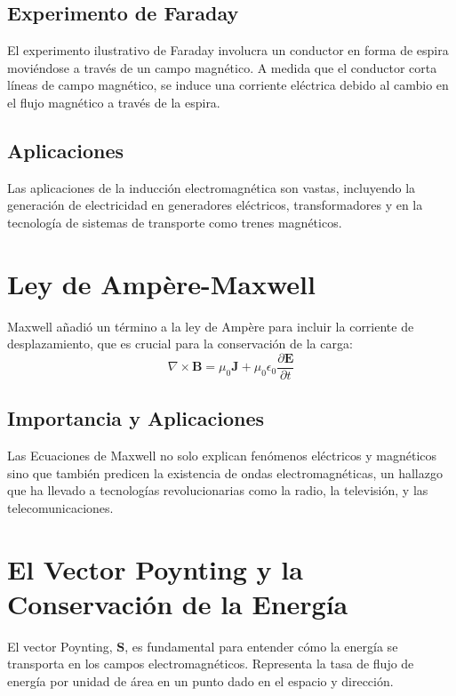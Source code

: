 \documentclass{article}
\begin{document}
\subsection{Experimento de Faraday}
El experimento ilustrativo de Faraday involucra un conductor en forma de espira moviéndose a través de un campo magnético. A medida que el conductor corta líneas de campo magnético, se induce una corriente eléctrica debido al cambio en el flujo magnético a través de la espira. 


\subsection{Aplicaciones}
Las aplicaciones de la inducción electromagnética son vastas, incluyendo la generación de electricidad en generadores eléctricos, transformadores y en la tecnología de sistemas de transporte como trenes magnéticos.


\section{Ley de Ampère-Maxwell}
Maxwell añadió un término a la ley de Ampère para incluir la corriente de desplazamiento, que es crucial para la conservación de la carga:
\begin{equation}
	\nabla \times \mathbf{B} = \mu_0 \mathbf{J} + \mu_0 \epsilon_0 \frac{\partial \mathbf{E}}{\partial t}
\end{equation}

\subsection{Importancia y Aplicaciones}
Las Ecuaciones de Maxwell no solo explican fenómenos eléctricos y magnéticos sino que también predicen la existencia de ondas electromagnéticas, un hallazgo que ha llevado a tecnologías revolucionarias como la radio, la televisión, y las telecomunicaciones.


\section{El Vector Poynting y la Conservación de la Energía}
El vector Poynting, \(\mathbf{S}\), es fundamental para entender cómo la energía se transporta en los campos electromagnéticos. Representa la tasa de flujo de energía por unidad de área en un punto dado en el espacio y dirección.
\end{document}
